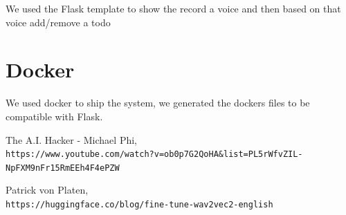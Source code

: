 \documentclass[fleqn,10pt]{SelfArx} %
\begin{document}
We used the Flask template to show the record a voice and then based on that voice add/remove a todo    

\section{Docker}
We used docker to ship the system, we generated the dockers files to be compatible with Flask.


\begin{thebibliography}{9}


The A.I. Hacker - Michael Phi,
\\\texttt{https://www.youtube.com/watch?v=ob0p7G2QoHA\&list=PL5rWfvZIL-NpFXM9nFr15RmEEh4F4ePZW}

Patrick von Platen,
\\\texttt{https://huggingface.co/blog/fine-tune-wav2vec2-english}
\end{thebibliography}
\end{document}
